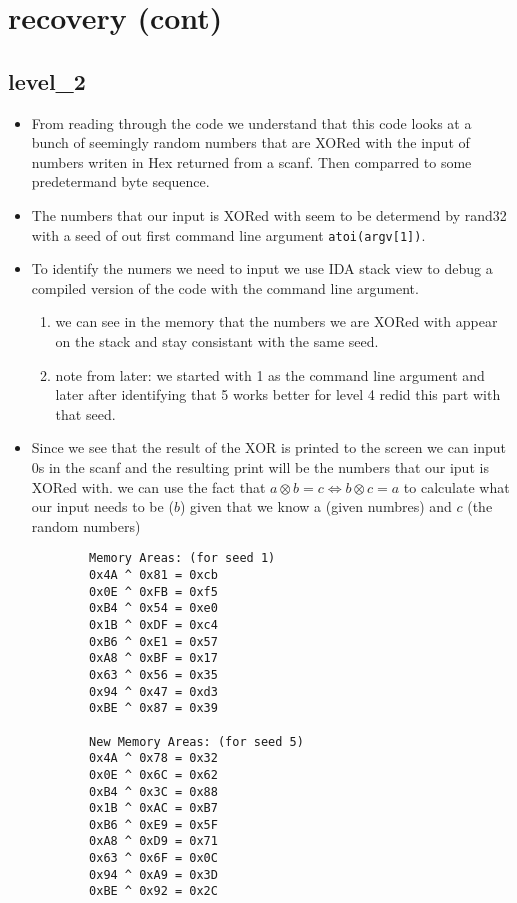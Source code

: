 \documentclass{article}
\begin{document}
\section{recovery (cont)}
\subsection{level\_2}
\begin{itemize}
	\item From reading through the code we understand that this code looks at a bunch of seemingly random numbers 
	that are XORed with the input of numbers writen in Hex returned from a scanf. Then comparred to some predetermand byte sequence.
	\item The numbers that our input is XORed with seem to be determend by rand32 with a seed of out first command line argument \texttt{atoi(argv[1])}.
	\item To identify the numers we need to input we use IDA stack view to debug a compiled version of the code with the command line argument.
    \begin{enumerate}
        \item we can see in the memory that the numbers we are XORed with appear on the stack and stay consistant with the same seed.
        \item note from later: we started with 1 as the command line argument and later after identifying that 5 works better for level 4 redid this part with that seed.
    \end{enumerate}
    \item Since we see that the result of the XOR is printed to the screen we can input 0s in the scanf and the resulting print will be the numbers that our iput is XORed with.
	  we can use the fact that $a\otimes  b = c \Leftrightarrow b\otimes c = a$ to calculate what our input needs to be ($b$) given that we know a (given numbres) and $c$ (the random numbers)
	\begin{small}\begin{verbatim}	
		Memory Areas: (for seed 1)
		0x4A ^ 0x81 = 0xcb
		0x0E ^ 0xFB = 0xf5
		0xB4 ^ 0x54 = 0xe0
		0x1B ^ 0xDF = 0xc4
		0xB6 ^ 0xE1 = 0x57
		0xA8 ^ 0xBF = 0x17
		0x63 ^ 0x56 = 0x35
		0x94 ^ 0x47 = 0xd3
		0xBE ^ 0x87 = 0x39

		New Memory Areas: (for seed 5)
		0x4A ^ 0x78 = 0x32
		0x0E ^ 0x6C = 0x62
		0xB4 ^ 0x3C = 0x88
		0x1B ^ 0xAC = 0xB7
		0xB6 ^ 0xE9 = 0x5F
		0xA8 ^ 0xD9 = 0x71
		0x63 ^ 0x6F = 0x0C
		0x94 ^ 0xA9 = 0x3D
		0xBE ^ 0x92 = 0x2C


\end{verbatim}
\end{small}
\end{itemize}
\end{document}
